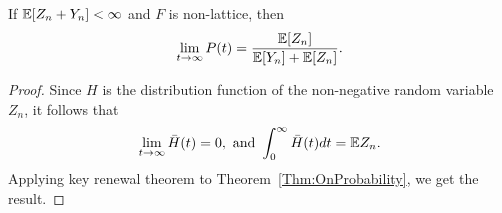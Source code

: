 \documentclass[a4paper,10pt,english]{article}
\begin{document}
\begin{cor}
\label{cor:LimitingOnProbability}
If $\mathbb{E}[Z_n+Y_n]< \infty $ and $F$ is non-lattice, then 
\begin{equation*}
\lim_{t \to \infty}P(t)=\frac{\mathbb{E}[Z_n]}{\mathbb{E}[Y_n]+\mathbb{E}[Z_n]}.
\end{equation*}
\end{cor}
\begin{proof} Since $H$ is the distribution function of the non-negative random variable $Z_n$, it follows that 
\begin{align*}
\lim_{t \to \infty}\bar{H}(t) = 0, \text{ and } \int_0^\infty \bar{H}(t)dt = \mathbb{E} Z_n.
\end{align*}
Applying key renewal theorem to Theorem~\ref{Thm:OnProbability}, we get the result.
\end{proof}
\end{document}
